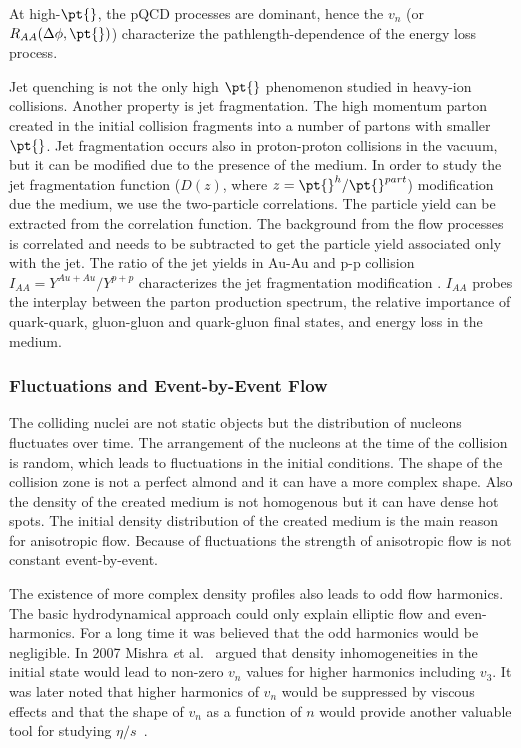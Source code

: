 At high-$\pt{}$, the pQCD processes are dominant, hence the $v_n$ (or $R_{AA}(\Delta\phi, \pt{})$) characterize the pathlength-dependence of the energy loss process.

Jet quenching is not the only high $\pt{}$ phenomenon studied in heavy-ion collisions. Another property is jet fragmentation. The high momentum parton created in the initial collision fragments into a number of partons with smaller $\pt{}$. Jet fragmentation occurs also in proton-proton collisions in the vacuum, but it can be modified due to the presence of the medium. In order to study the jet fragmentation function ($D(z)$, where $z= \pt{}^h/\pt{}^{part}$) modification due the medium, we use the two-particle correlations. The particle yield can be extracted from the correlation function. The background from the flow processes is correlated and needs to be subtracted to get the particle yield associated only with the jet. The ratio of the jet yields in Au-Au and p-p collision $I_{AA} = {Y^{Au+Au}}/{Y^{p+p}}$ characterizes the jet fragmentation modification \cite{Aamodt:2011vg}. $I_{AA}$ probes the interplay between the parton production spectrum, the relative importance of quark-quark, gluon-gluon and quark-gluon final states, and energy loss in the medium.

\FloatBarrier
\subsubsection{Fluctuations and Event-by-Event Flow}
The colliding nuclei are not static objects but the distribution of nucleons fluctuates over time. The arrangement of the nucleons at the time of the collision is random, which leads to fluctuations in the initial conditions. The shape of the collision zone is not a perfect almond and it can have a more complex shape. Also the density of the created medium is not homogenous but it can have dense hot spots. The initial density distribution of the created medium is the main reason for anisotropic flow. Because of fluctuations the strength of anisotropic flow is not constant event-by-event.

The existence of more complex density profiles also leads to odd flow harmonics. The basic hydrodynamical approach could only explain elliptic flow and even-harmonics. For a long time it was believed that the odd harmonics would be negligible. In 2007 Mishra {\emph et al.}~\cite{Mishra:2007tw} argued that density inhomogeneities in the initial state would lead to non-zero $v_n$ values for higher harmonics including $v_3$.  It was later noted that higher harmonics of $v_n$ would be suppressed by viscous effects and that the shape of $v_n$ as a function of $n$ would provide another valuable tool for studying $\eta/s$~\cite{Mocsy:2010um}. 

